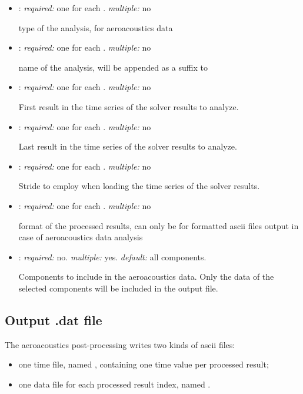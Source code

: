 \begin{itemize}
\item {}: \textit{required:} one for each . \textit{multiple:} no

type of the analysis,  for aeroacoustics data

\item {}: \textit{required:} one for each . \textit{multiple:} no

name of the analysis, will be appended as a suffix to 

\item {}: \textit{required:} one for each . 
\textit{multiple:} no

First result in the time series of the solver results to analyze.

\item {}: \textit{required:} one for each . 
\textit{multiple:} no

Last result in the time series of the solver results to analyze.

\item {}: \textit{required:} one for each . 
\textit{multiple:} no

Stride to employ when loading the time series of the solver results. 

\item {}: \textit{required:} one for each . 
\textit{multiple:} no

format of the processed results, can only be  for formatted ascii 
files output in case of aeroacoustics data analysis

\item {}: \textit{required:} no. \textit{multiple:} yes. 
\textit{default:} all components.

Components to include in the aeroacoustics data. Only the data of the 
selected components will be included in the output file. 

\end{itemize}

\subsection{Output .dat file}
The aeroacoustics post-processing writes two kinds of ascii files:
\begin{itemize}
\item one time file, named ,
containing one time value per processed result;
\item one data file for each processed result index, named
.
\end{itemize}

